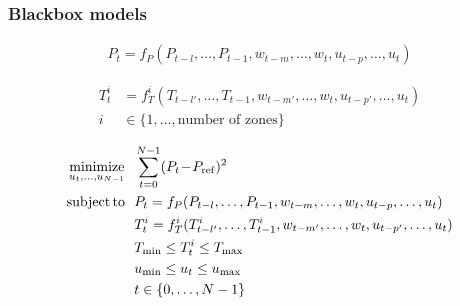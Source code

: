 \begin{frame}[t]
	
	\frametitle{Blackbox models}
	
	\begin{align*}
	P_t = f_P(P_{t-l}, \dots, P_{t-1}, w_{t-m}, \dots, w_{t}, u_{t-p}, \dots, u_{t})
	\end{align*}
	
	\begin{align*}
	T_t^i & = f_T^i(T_{t-l'}, \dots, T_{t-1}, w_{t-m'}, \dots, w_{t}, u_{t-p'}, \dots, u_{t}) \\
	i  & \in \{ 1, \dots, \text{number of zones} \}
	\end{align*}
	
	\begin{align*}
	&\operatorname*{minimize}_{u_t,\dots,u_{N-1}} \  \  \sum_{t=0}^{N-1} (P_{t}\!-\!P_{\mathrm{ref}})^2\\
	& 
	\begin{aligned}
	\operatorname*{subject\,to} \  \  & P_t = f_P(P_{t-l}, \dots, P_{t-1}, w_{t-m}, \dots, w_{t}, u_{t-p}, \dots, u_{t}) \\
	& T_t^i = f_T^i(T^i_{t-l'}, \dots, T^i_{t-1}, w_{t-m'}, \dots, w_{t}, u_{t-p'}, \dots, u_{t}) \\
	& T_{\mathrm{min}} \leq T_{t}^i \leq T_{\mathrm{max}} \\	
	& u_{\mathrm{min}} \leq u_{t} \leq u_{\mathrm{max}} \\
	& t \in \{ 0, \dots, N-1 \}
	\end{aligned}
	\end{align*}
	
\end{frame}


